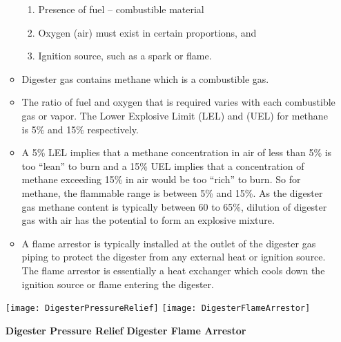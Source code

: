 \begin{enumerate}[A.]
\begin{itemize}
\begin{enumerate}
                    \item Presence of fuel – combustible material
                    \item Oxygen (air) must exist in certain proportions, and
                    \item Ignition source, such as a spark or flame.
                \end{enumerate}  
            \item Digester gas contains methane which is a combustible gas.  
            \item The ratio of fuel and oxygen that is required varies with each combustible gas or vapor. The Lower Explosive Limit (LEL) and (UEL) for methane is 5\% and 15\% respectively.  
            \item A 5\% LEL implies that a methane concentration in air of less than 5\% is too “lean” to burn and a 15\% UEL implies that a concentration of methane exceeding 15\% in air would be too “rich” to burn.  So for methane, the flammable range is between 5\% and 15\%.  As the digester gas methane content is typically between 60 to 65\%, dilution of digester gas with air has the potential to form an explosive mixture. 
            \item A flame arrestor is typically installed at the outlet of the digester gas piping to protect the digester from any external heat or ignition source.  The flame arrestor is essentially a heat exchanger which cools down the ignition source or flame entering the digester. 
        \end{itemize}
        \begin{center}
            \texttt{[image: DigesterPressureRelief]} \hspace{5cm} \texttt{[image: DigesterFlameArrestor]} \\
        \end{center}
        \hspace{2cm}\textbf{Digester Pressure Relief} \hspace{3cm} \textbf{Digester Flame Arrestor}\\
\end{enumerate}



\newpage
